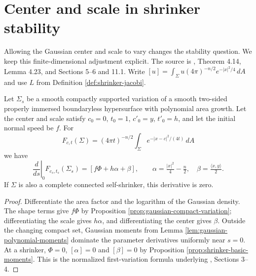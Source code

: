 \chapter{Center and scale in shrinker stability}\label{sec:shrinker-stability}
Allowing the Gaussian center and scale to vary changes the stability question. We keep this finite-dimensional adjustment explicit. The source is \cite{CM12}, Theorem 4.14, Lemma 4.23, and Sections 5--6 and 11.1. Write $[u]=\int_\Sigma u(4\pi)^{-n/2}e^{-|x|^2/4}\,dA$ and use $L$ from Definition \ref{def:shrinker-jacobi}.

\begin{proposition}\label{prop:gaussian-joint-first}
Let $\Sigma_s$ be a smooth compactly supported variation of a smooth two-sided properly immersed boundaryless hypersurface with polynomial area growth. Let the center and scale satisfy $c_0=0$, $t_0=1$, $c'_0=y$, $t'_0=h$, and let the initial normal speed be $f$. For
\[
 F_{c,t}(\Sigma)=(4\pi t)^{-n/2}\int_\Sigma e^{-|x-c|^2/(4t)}\,dA
\]
we have
\[
 \left.\frac{d}{ds}\right|_0 F_{c_s,t_s}(\Sigma_s)
 =[f\Phi+h\alpha+\beta],\qquad
 \alpha=\tfrac{|x|^2}{4}-\tfrac n2,\quad \beta=\tfrac{\langle x,y\rangle}{2}.
\]
If $\Sigma$ is also a complete connected self-shrinker, this derivative is zero.
\end{proposition}
\begin{proof}
Differentiate the area factor and the logarithm of the Gaussian density. The shape terms give $f\Phi$ by Proposition \ref{prop:gaussian-compact-variation}; differentiating the scale gives $h\alpha$, and differentiating the center gives $\beta$. Outside the changing compact set, Gaussian moments from Lemma \ref{lem:gaussian-polynomial-moments} dominate the parameter derivatives uniformly near $s=0$. At a shrinker, $\Phi=0$, $[\alpha]=0$ and $[\beta]=0$ by Proposition \ref{prop:shrinker-basic-moments}. This is the normalized first-variation formula underlying \cite{CM12}, Sections 3--4.
\end{proof}

